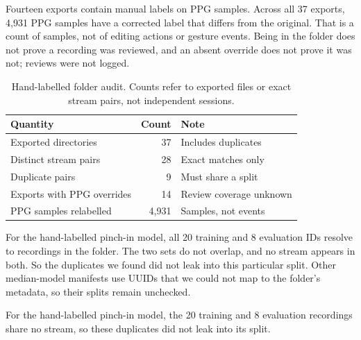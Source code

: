\iffull
Fourteen exports contain manual labels on PPG samples. Across all 37 exports, 4,931 PPG samples have a corrected label that differs from the original. That is a count of samples, not of editing actions or gesture events. Being in the folder does not prove a recording was reviewed, and an absent override does not prove it was not; reviews were not logged.
\fi

\begin{table}[t]
\centering\small
\caption[Hand-labelled folder audit]{Hand-labelled folder audit. Counts refer to exported files or exact stream pairs, not independent sessions.}\label{tab-audit}
\begin{tabularx}{\linewidth}{@{}>{\raggedright\arraybackslash}Xr>{\raggedright\arraybackslash}X@{}}
\toprule
\textbf{Quantity} & \textbf{Count} & \textbf{Note} \\
\midrule
Exported directories & 37 & Includes duplicates \\
Distinct stream pairs & 28 & Exact matches only \\
Duplicate pairs & 9 & Must share a split \\
Exports with PPG overrides & 14 & Review coverage unknown \\
PPG samples relabelled & 4,931 & Samples, not events \\
\bottomrule
\end{tabularx}
\end{table}

\iffull
For the hand-labelled pinch-in model, all 20 training and 8 evaluation IDs resolve to recordings in the folder. The two sets do not overlap, and no stream appears in both. So the duplicates we found did not leak into this particular split. Other median-model manifests use UUIDs that we could not map to the folder's metadata, so their splits remain unchecked.

\else
For the hand-labelled pinch-in model, the 20 training and 8 evaluation recordings share no stream, so these duplicates did not leak into its split.
\fi